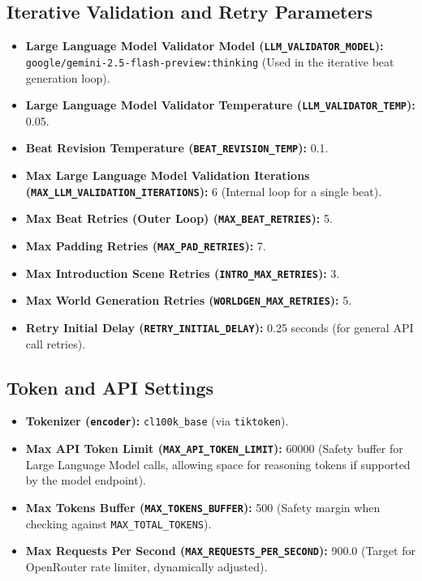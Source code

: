 \documentclass{article}
\begin{document}
\subsection{Iterative Validation and Retry Parameters}
\begin{itemize}
  \item \textbf{Large Language Model Validator Model (\texttt{LLM\_VALIDATOR\_MODEL}):} \texttt{google/gemini-2.5-flash-preview:thinking} (Used in the iterative beat generation loop).
  \item \textbf{Large Language Model Validator Temperature (\texttt{LLM\_VALIDATOR\_TEMP}):} 0.05.
  \item \textbf{Beat Revision Temperature (\texttt{BEAT\_REVISION\_TEMP}):} 0.1.
  \item \textbf{Max Large Language Model Validation Iterations (\texttt{MAX\_LLM\_VALIDATION\_ITERATIONS}):} 6 (Internal loop for a single beat).
  \item \textbf{Max Beat Retries (Outer Loop) (\texttt{MAX\_BEAT\_RETRIES}):} 5.
  \item \textbf{Max Padding Retries (\texttt{MAX\_PAD\_RETRIES}):} 7.
  \item \textbf{Max Introduction Scene Retries (\texttt{INTRO\_MAX\_RETRIES}):} 3.
  \item \textbf{Max World Generation Retries (\texttt{WORLDGEN\_MAX\_RETRIES}):} 5.
  \item \textbf{Retry Initial Delay (\texttt{RETRY\_INITIAL\_DELAY}):} 0.25 seconds (for general API call retries).
\end{itemize}

\subsection{Token and API Settings}
\begin{itemize}
  \item \textbf{Tokenizer (\texttt{encoder}):} \texttt{cl100k\_base} (via \texttt{tiktoken}).
  \item \textbf{Max API Token Limit (\texttt{MAX\_API\_TOKEN\_LIMIT}):} \num{60000} (Safety buffer for Large Language Model calls, allowing space for reasoning tokens if supported by the model endpoint).
  \item \textbf{Max Tokens Buffer (\texttt{MAX\_TOKENS\_BUFFER}):} 500 (Safety margin when checking against \texttt{MAX\_TOTAL\_TOKENS}).
  \item \textbf{Max Requests Per Second (\texttt{MAX\_REQUESTS\_PER\_SECOND}):} 900.0 (Target for OpenRouter rate limiter, dynamically adjusted).
\end{itemize}
\end{document}
